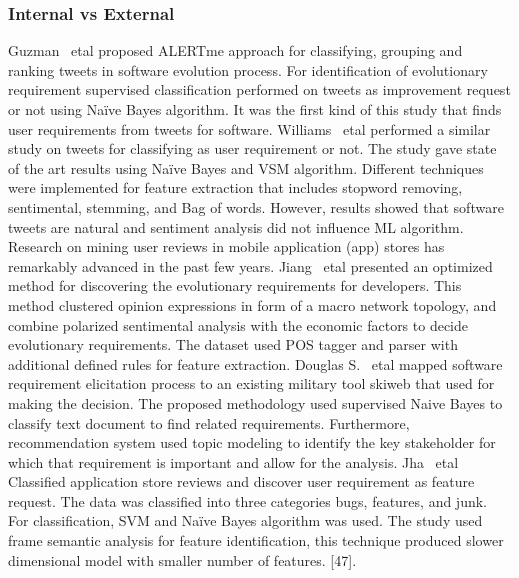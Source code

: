 \subsubsection{Internal vs External}

Guzman ~etal \cite{Guzman:2017} proposed ALERTme approach for classifying,
grouping and ranking tweets in software evolution process. For identification of
evolutionary requirement supervised classification performed on tweets as
improvement request or not using Naïve Bayes algorithm. It was the first kind of
this study that finds user requirements from tweets for software. Williams ~etal
 \cite{Williams:2017} performed a similar study on
tweets for classifying as user requirement or not. The study gave state of the art results using Naïve Bayes
and VSM algorithm. Different techniques were implemented for feature extraction
that includes stopword removing, sentimental, stemming, and Bag of words.
However, results showed that software tweets are natural  and sentiment analysis did not influence ML algorithm.\\

Research on mining user reviews in mobile application (app) stores has
remarkably advanced in the past few years. Jiang ~etal \cite{Jiang:2014}
presented an optimized method for discovering the evolutionary requirements for
developers. This method clustered opinion expressions in form of a macro network
topology, and combine polarized sentimental analysis with the economic factors
to decide evolutionary requirements. The dataset used POS tagger and parser with
additional defined rules for feature extraction. Douglas S. ~etal
\cite{Douglas:S2008} mapped software requirement elicitation process to an
existing military tool skiweb that used for making the decision. The proposed
methodology used supervised Naive Bayes to classify text document to find
related requirements. Furthermore, recommendation system used topic modeling to
identify the key stakeholder for which that requirement is important and allow
for the analysis. Jha ~etal \cite{Jha:2017} Classified application store reviews
and discover user requirement as feature request. The data was classified into
three categories bugs, features, and junk. For classification, SVM and Naïve
Bayes algorithm was used. The study used frame semantic analysis for feature
identification, this technique produced slower  dimensional model
with smaller number of features. [47]. \\

